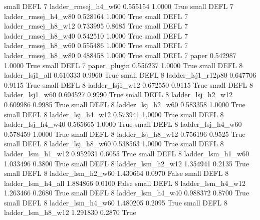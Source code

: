      small     DEFL                 7      ladder_rmsej_h4_w60   0.555154      1.0000    True
     small     DEFL                 7      ladder_rmsej_h4_w80   0.528164      1.0000    True
     small     DEFL                 7      ladder_rmsej_h8_w12   0.733995      0.8685    True
     small     DEFL                 7      ladder_rmsej_h8_w40   0.542510      1.0000    True
     small     DEFL                 7      ladder_rmsej_h8_w60   0.555486      1.0000    True
     small     DEFL                 7      ladder_rmsej_h8_w80   0.488458      1.0000    True
     small     DEFL                 7                    paper   0.542987      1.0000    True
     small     DEFL                 7             paper_plugin   0.556237      1.0000    True
     small     DEFL                 8          ladder_lsj1_all   0.610333      0.9960    True
     small     DEFL                 8       ladder_lsj1_r12p80   0.647706      0.9115    True
     small     DEFL                 8          ladder_lsj1_w12   0.672550      0.9115    True
     small     DEFL                 8          ladder_lsj1_w60   0.604527      0.9990    True
     small     DEFL                 8        ladder_lsj_h2_w12   0.609986      0.9985    True
     small     DEFL                 8        ladder_lsj_h2_w60   0.583358      1.0000    True
     small     DEFL                 8        ladder_lsj_h4_w12   0.573941      1.0000    True
     small     DEFL                 8        ladder_lsj_h4_w40   0.565665      1.0000    True
     small     DEFL                 8        ladder_lsj_h4_w60   0.578459      1.0000    True
     small     DEFL                 8        ladder_lsj_h8_w12   0.756196      0.9525    True
     small     DEFL                 8        ladder_lsj_h8_w60   0.538563      1.0000    True
     small     DEFL                 8        ladder_lsm_h1_w12   0.952931      0.6055    True
     small     DEFL                 8        ladder_lsm_h1_w60   1.033496      0.3800    True
     small     DEFL                 8        ladder_lsm_h2_w12   1.354941      0.2135    True
     small     DEFL                 8        ladder_lsm_h2_w60   1.430664      0.0970   False
     small     DEFL                 8        ladder_lsm_h4_all   1.884866      0.0100   False
     small     DEFL                 8        ladder_lsm_h4_w12   1.263466      0.2680    True
     small     DEFL                 8        ladder_lsm_h4_w40   0.988372      0.8700    True
     small     DEFL                 8        ladder_lsm_h4_w60   1.480205      0.2095    True
     small     DEFL                 8        ladder_lsm_h8_w12   1.291830      0.2870    True
